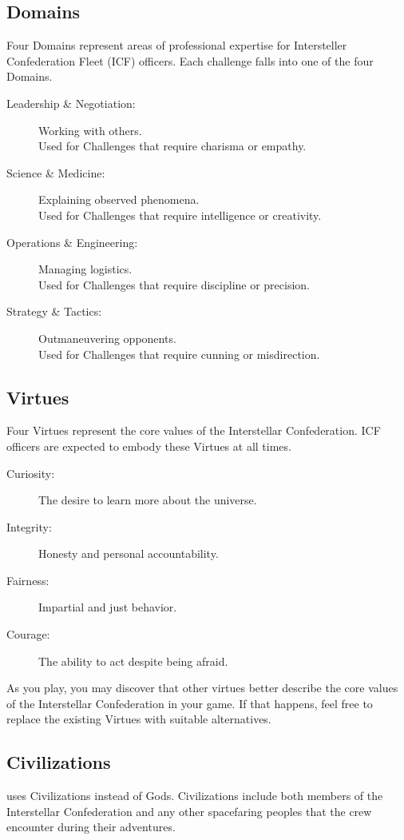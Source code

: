 \documentclass[11pt, a5paper, parskip=half-, DIV=12]{scrartcl}
\begin{document}
\subsection*{Domains}
Four Domains represent areas of professional expertise for Intersteller Confederation Fleet (ICF) officers. Each challenge falls into one of the four Domains.
\begin{description}
	\item[Leadership \& Negotiation:] Working with others.\\Used for Challenges that require charisma or empathy.
	\item[Science \& Medicine:] Explaining observed phenomena.\\Used for Challenges that require intelligence or creativity.
	\item[Operations \& Engineering:] Managing logistics.\\Used for Challenges that require discipline or precision.
	\item[Strategy \& Tactics:] Outmaneuvering opponents.\\Used for Challenges that require cunning or misdirection.
\end{description}

\subsection*{Virtues}
Four Virtues represent the core values of the Interstellar Confederation. ICF officers are expected to embody these Virtues at all times.
\begin{description}
	\item[Curiosity:] The desire to learn more about the universe.
	\item[Integrity:] Honesty and personal accountability.
	\item[Fairness:] Impartial and just behavior.
	\item[Courage:] The ability to act despite being afraid.
\end{description}
As you play, you may discover that other virtues better describe the core values of the Interstellar Confederation in your game.  If that happens, feel free to replace the existing Virtues with suitable alternatives.

\newpage

\subsection*{Civilizations}
\ENDEAVOUR{} uses Civilizations instead of Gods.  Civilizations include both members of the Interstellar Confederation and any other spacefaring peoples that the crew encounter during their adventures.
\end{document}
